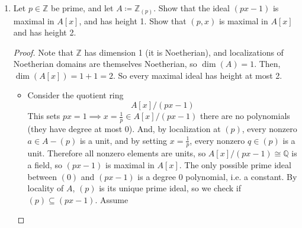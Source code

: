 \documentclass[hidelinks,12pt]{article}
\newcommand{\Z}{\mathbb{Z}}
\newcommand{\Q}{\mathbb{Q}}
\begin{document}
\begin{enumerate}
\begin{enumerate}[label=(\alph*).]
\begin{proof}
\begin{itemize}
                    \item \textbf{Claim:} \(\Z[\frac{1}{b}]\subseteq\Z[\frac{a}{b}]\)\par
                        By Bezout's lemma, since \(\gcd(a,b)=1\), \(\exists x,y\in\Z\) with \(ax+by=1\). Let \(\frac{1}{b}\in\Z[\frac{1}{b}]\), then \[
                            \frac{1}{b}=\frac{(ax+by)}{b}=\frac{a}{b}x+y\in\Z[\frac{a}{b}]
                        \]
                    \item \textbf{Claim:} \(\Z[\frac{1}{b}]\supseteq\Z[\frac{a}{b}]\)\par
                        Let \(\frac{a}{b}\in\Z[\frac{a}{b}]\) then \[
                            \frac{a}{b}=a\frac{1}{b}\in\Z[\frac{1}{b}]
                        \]
                \end{itemize}
                So \(\Z[\frac{1}{b}]=\Z[\frac{a}{b}]\).
            \end{proof}
        \item \begin{proof}
        Let \(A\subseteq\Q\) be a subring of \(\Q\) such that \(1\in A\). Recall intermediate rings \[
        \Z\subseteq A\subseteq\Q
        \]
        Are identified with localizations of \(\Z\). Prime ideals of \(\Z\) are exactly \(p\Z\) for \(p\in\Z\) prime. For each ideal \(P=p\Z\), the localization \(P^{-1}\Z\) is isomorphic to \(\Z[\frac{1}{p}]\) (by the universal property). So let \(A=P^{-1}\Z\cong\Z[\frac{1}{p}]\) be some localization. By proposition 6.17, \(\Z\) Noetherian implies \(P^{-1}\Z\cong\Z[\frac{1}{p}]\) Noetherian. Therefore \(A\) is Noetherian.
    \end{proof}
    \end{enumerate}
\item Let \(p\in\Z\) be prime, and let \(A\coloneqq\Z_{(p)}\). Show that the ideal \((px-1)\) is maximal in \(A[x]\), and has height 1. Show that \((p,x)\) is maximal in \(A[x]\) and has height 2.
    \begin{proof}
        Note that \(\Z\) has dimension 1 (it is Noetherian), and localizations of Noetherian domains are themselves Noetherian, so \(\dim(A)=1\). Then, \(\dim(A[x])=1+1=2\). So every maximal ideal has height at most 2.
\begin{itemize}
    \item Consider the quotient ring
        \[
            A[x]/(px-1)
        \]
        This sets \(px=1\implies x=\frac{1}{p}\in A[x]/(px-1)\) there are no polynomials (they have degree at most 0). And, by localization at \((p)\), every nonzero \(a\in A-(p)\) is a unit, and by setting \(x=\frac{1}{p}\), every nonzero \(q\in(p)\) is a unit. Therefore all nonzero elements are units, so \(A[x]/(px-1)\cong\Q\) is a field, so \((px-1)\) is maximal in \(A[x]\). The only possible prime ideal between \((0)\) and \((px-1)\) is a degree 0 polynomial, i.e. a constant. By locality of \(A\), \((p)\) is its unique prime ideal, so we check if \((p)\subseteq(px-1)\). Assume \[
\]
\end{itemize}
\end{proof}
\end{enumerate}
\end{document}
